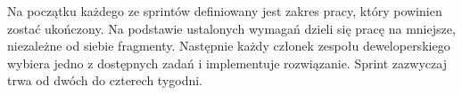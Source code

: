 Na początku każdego ze sprintów definiowany jest zakres pracy, który powinien zostać
ukończony. Na podstawie ustalonych wymagań dzieli się pracę na mniejsze, niezależne
od siebie fragmenty. Następnie każdy członek zespołu deweloperskiego wybiera jedno
z dostępnych zadań i implementuje rozwiązanie. Sprint zazwyczaj trwa od dwóch do
czterech tygodni.